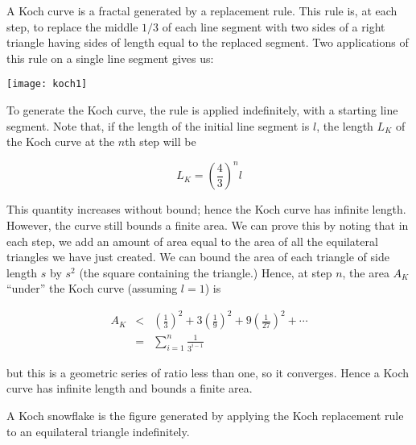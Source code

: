 \documentclass[12pt]{article}
\begin{document}
A Koch curve is a fractal generated by a replacement rule.  This rule is, at each step, to replace the middle $1/3$ of each line segment with two sides of a right triangle having sides of length equal to the replaced segment.  Two applications of this rule on a single line segment gives us:

\begin{center}
\texttt{[image: koch1]}
\end{center}

To generate the Koch curve, the rule is applied indefinitely, with a starting line segment.  Note that, if the length of the initial line segment is $l$, the length $L_K$ of the Koch curve at the $n$th step will be

$$ L_K = \left( \frac{4}{3} \right)^n l $$

This quantity increases without bound; hence the Koch curve has infinite length.  However, the curve still bounds a finite area.  We can prove this by noting that in each step, we add an amount of area equal to the area of all the equilateral triangles we have just created.  We can bound the area of each triangle of side length $s$ by $s^2$ (the square containing the triangle.)  Hence, at step $n$, the area $A_K$ ``under'' the Koch curve (assuming $l=1$) is 

\begin{eqnarray*} A_K & < & \left(\frac{1}{3}\right)^2 + 3 \left(\frac{1}{9}\right)^2 + 9 \left(\frac{1}{27}\right)^2 +  \cdots \\ 
 & = & \sum_{i=1}^n \frac{1}{3^{i-1}} 
\end{eqnarray*}

but this is a geometric series of ratio less than one, so it converges.  Hence a Koch curve has infinite length and bounds a finite area.

A Koch snowflake is the figure generated by applying the Koch replacement rule to an equilateral triangle indefinitely.
\end{document}
